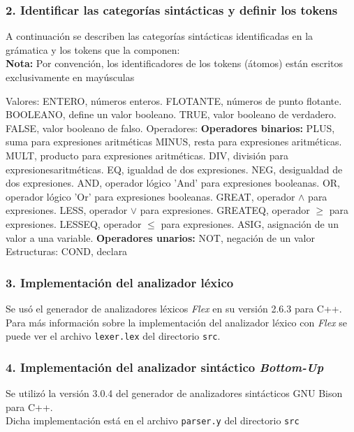 \documentclass[12pt]{article}
\begin{document}
\subsubsection*{2. Identificar las categorías sintácticas y definir los tokens}
A continuación se describen las categorías sintácticas identificadas en la grámatica y los tokens que la componen:\\
\textbf{Nota:} Por convención, los identificadores de los tokens (átomos) están escritos exclusivamente en mayúsculas 
\begin{outline}
\1 Valores:
    \2 ENTERO, números enteros.
    \2 FLOTANTE, números de punto flotante.
    \2 BOOLEANO, define un valor booleano.
    \3 TRUE, valor booleano de verdadero.
    \3 FALSE, valor booleano de falso.
\1 Operadores:
    \2 \textbf{Operadores binarios:}
        \3 PLUS, suma para expresiones aritméticas
        \3 MINUS, resta para expresiones aritméticas.
        \3 MULT, producto para expresiones aritméticas.
        \3 DIV, división para expresionesaritméticas.
        \3 EQ, igualdad de dos expresiones.
        \3 NEG, desigualdad de dos expresiones.
        \3 AND, operador lógico 'And' para expresiones booleanas.
        \3 OR, operador lógico 'Or' para expresiones booleanas.
        \3 GREAT, operador $\land$ para expresiones.
        \3 LESS, operador $\lor$ para expresiones.
        \3 GREATEQ, operador $\geq$ para expresiones.
        \3 LESSEQ, operador $\leq$ para expresiones.
        \3 ASIG, asignación de un valor a una variable.
    \2 \textbf{Operadores unarios:}
        \3 NOT, negación de un valor
 \1 Estructuras:
    \2 COND, declara
\end{outline}
\subsubsection*{3. Implementación del analizador léxico}
Se usó el generador de analizadores léxicos \textit{Flex} en su versión 2.6.3 para C++. \\
Para más información sobre la implementación del analizador léxico con \textit{Flex} se puede ver el archivo \texttt{lexer.lex} del directorio \texttt{src}.\\
\subsubsection*{4. Implementación del analizador sintáctico \textit{Bottom-Up}}
Se utilizó la versión 3.0.4 del generador de analizadores sintácticos GNU Bison para C++. \\
Dicha implementación está en el archivo \texttt{parser.y} del directorio \texttt{src}
\end{document}
